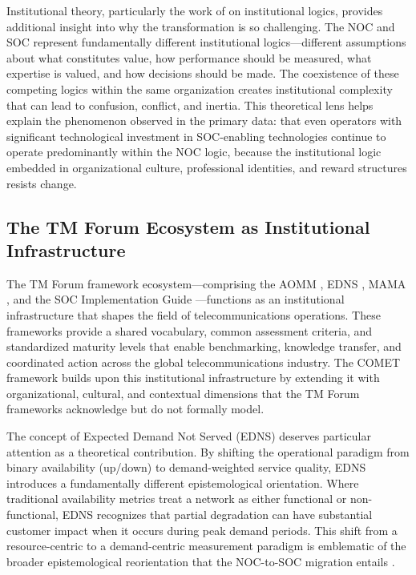 \documentclass[12pt,a4paper]{article}
\begin{document}
Institutional theory, particularly the work of \citet{dimaggio1988interest} on institutional logics, provides additional insight into why the transformation is so challenging. The NOC and SOC represent fundamentally different institutional logics---different assumptions about what constitutes value, how performance should be measured, what expertise is valued, and how decisions should be made. The coexistence of these competing logics within the same organization creates institutional complexity that can lead to confusion, conflict, and inertia. This theoretical lens helps explain the phenomenon observed in the primary data: that even operators with significant technological investment in SOC-enabling technologies continue to operate predominantly within the NOC logic, because the institutional logic embedded in organizational culture, professional identities, and reward structures resists change.

\subsection{The TM Forum Ecosystem as Institutional Infrastructure}

The TM Forum framework ecosystem---comprising the AOMM \citep{tmforum2024b,tmforum2026aomm}, EDNS \citep{tmforum2024c}, MAMA \citep{tmforum2024d}, and the SOC Implementation Guide \citep{tmforum2025soc}---functions as an institutional infrastructure that shapes the field of telecommunications operations. These frameworks provide a shared vocabulary, common assessment criteria, and standardized maturity levels that enable benchmarking, knowledge transfer, and coordinated action across the global telecommunications industry. The COMET framework builds upon this institutional infrastructure by extending it with organizational, cultural, and contextual dimensions that the TM Forum frameworks acknowledge but do not formally model.

The concept of Expected Demand Not Served (EDNS) deserves particular attention as a theoretical contribution. By shifting the operational paradigm from binary availability (up/down) to demand-weighted service quality, EDNS introduces a fundamentally different epistemological orientation. Where traditional availability metrics treat a network as either functional or non-functional, EDNS recognizes that partial degradation can have substantial customer impact when it occurs during peak demand periods. This shift from a resource-centric to a demand-centric measurement paradigm is emblematic of the broader epistemological reorientation that the NOC-to-SOC migration entails \citep{orourke2019green}.
\end{document}
